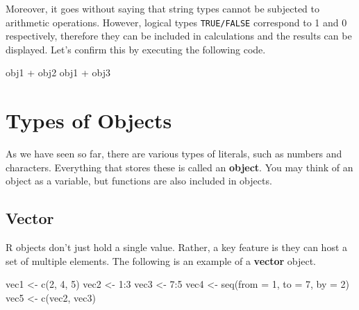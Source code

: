 \documentclass[
  a4paper,
]{book}
\newenvironment{Shaded}{\begin{snugshade}}{\end{snugshade}}
\newcommand{\AttributeTok}[1]{\textcolor[rgb]{0.40,0.45,0.13}{#1}}
\newcommand{\DecValTok}[1]{\textcolor[rgb]{0.68,0.00,0.00}{#1}}
\newcommand{\FunctionTok}[1]{\textcolor[rgb]{0.28,0.35,0.67}{#1}}
\newcommand{\NormalTok}[1]{\textcolor[rgb]{0.00,0.23,0.31}{#1}}
\newcommand{\OtherTok}[1]{\textcolor[rgb]{0.00,0.23,0.31}{#1}}
\newcommand{\SpecialCharTok}[1]{\textcolor[rgb]{0.37,0.37,0.37}{#1}}
\begin{document}
Moreover, it goes without saying that string types cannot be subjected
to arithmetic operations. However, logical types \texttt{TRUE/FALSE}
correspond to 1 and 0 respectively, therefore they can be included in
calculations and the results can be displayed. Let's confirm this by
executing the following code.

\begin{Shaded}
\begin{Highlighting}[]
\NormalTok{obj1 }\SpecialCharTok{+}\NormalTok{ obj2}
\NormalTok{obj1 }\SpecialCharTok{+}\NormalTok{ obj3}
\end{Highlighting}
\end{Shaded}

\section{Types of Objects}\label{types-of-objects}

As we have seen so far, there are various types of literals, such as
numbers and characters. Everything that stores these is called an
\textbf{object}. You may think of an object as a variable, but functions
are also included in objects.

\subsection{Vector}\label{sec-vector}

R objects don't just hold a single value. Rather, a key feature is they
can host a set of multiple elements. The following is an example of a
\textbf{vector} object.

\begin{Shaded}
\begin{Highlighting}[]
\NormalTok{vec1 }\OtherTok{\textless{}{-}} \FunctionTok{c}\NormalTok{(}\DecValTok{2}\NormalTok{, }\DecValTok{4}\NormalTok{, }\DecValTok{5}\NormalTok{)}
\NormalTok{vec2 }\OtherTok{\textless{}{-}} \DecValTok{1}\SpecialCharTok{:}\DecValTok{3}
\NormalTok{vec3 }\OtherTok{\textless{}{-}} \DecValTok{7}\SpecialCharTok{:}\DecValTok{5}
\NormalTok{vec4 }\OtherTok{\textless{}{-}} \FunctionTok{seq}\NormalTok{(}\AttributeTok{from =} \DecValTok{1}\NormalTok{, }\AttributeTok{to =} \DecValTok{7}\NormalTok{, }\AttributeTok{by =} \DecValTok{2}\NormalTok{)}
\NormalTok{vec5 }\OtherTok{\textless{}{-}} \FunctionTok{c}\NormalTok{(vec2, vec3)}
\end{Highlighting}
\end{Shaded}
\end{document}
